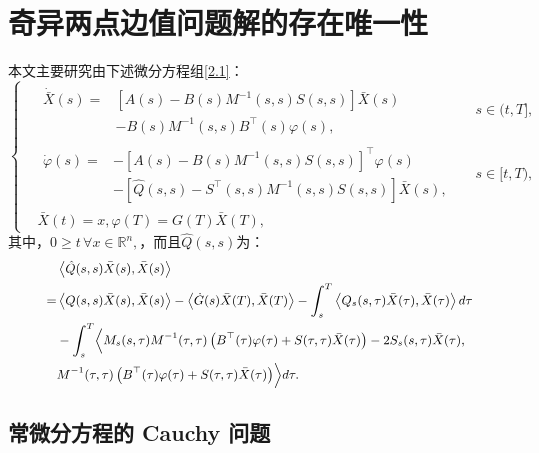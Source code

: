 \documentclass{GZUbachelorthesis}
\begin{document}
\section{奇异两点边值问题解的存在唯一性}
本文主要研究由下述微分方程组\eqref{2.1}：\\
\begin{equation}\label{2.1}
	\left\{
	\begin{aligned}
		&\begin{aligned}
			\dot{\bar{X}}(s) ={} & \left[A(s)-B(s)M^{-1}(s,s)S(s,s)\right]\bar{X}(s) \\
			& -B(s)M^{-1}(s,s)B^\top(s)\varphi(s),
		\end{aligned}
		&& s\in(t,T], \\[8pt]
		&\begin{aligned}
			\dot{\varphi}(s) ={} & -\left[A(s)-B(s)M^{-1}(s,s)S(s,s)\right]^\top\varphi(s) \\
			& -\left[\hat{Q}(s,s)-S^\top(s,s)M^{-1}(s,s)S(s,s)\right]\bar{X}(s),
		\end{aligned}
		&& s\in[t,T), \\[8pt]
		&\bar{X}(t) = x, \varphi(T) = G(T)\bar{X}(T),
	\end{aligned}
	\right.
\end{equation}
其中，${0\geq t \,\forall x\in\mathbb{R}^n,}$，而且$\hat{Q}(s,s)$为：
\begin{equation}\label{2.2}
	{\small 
		\begin{aligned}
			&\left\langle\hat{Q}(s,s)\bar{X}(s),\bar{X}(s)\right\rangle \\
			= &\left\langle Q(s,s)\bar{X}(s),\bar{X}(s)\right\rangle - \left\langle \dot{G}(s)\bar{X}(T),\bar{X}(T) \right\rangle -\int_{s}^{T}\left\langle Q_s(s,\tau)\bar{X}(\tau),\bar{X}(\tau) \right\rangle d\tau \\
			&-\int_{s}^{T}\Bigl\langle M_s(s,\tau)M^{-1}(\tau,\tau)\left(B^\top(\tau)\varphi(\tau)+S(\tau,\tau)\bar{X}(\tau)\right)-2S_s(s,\tau)\bar{X}(\tau), \\
			& M^{-1}(\tau,\tau)\left(B^\top(\tau)\varphi(\tau)+S(\tau,\tau)\bar{X}(\tau)\right)\Bigr\rangle d\tau.
	\end{aligned}}
\end{equation}
\subsection{常微分方程的 Cauchy 问题}
\end{document}
